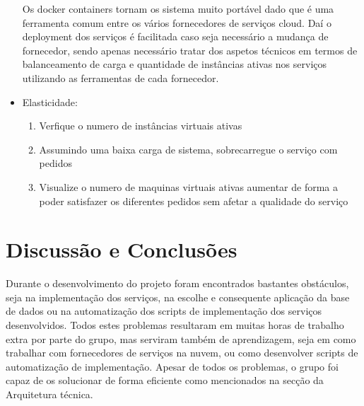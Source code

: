 \documentclass[11pt,a4paper]{article}
\begin{document}
\begin{itemize}
Os docker containers tornam os sistema muito portável dado que é uma ferramenta comum entre os vários fornecedores de serviços cloud. Daí o deployment dos serviços é facilitada caso seja necessário a mudança de fornecedor, sendo apenas necessário tratar dos aspetos técnicos em termos de balanceamento de carga e quantidade de instâncias ativas nos serviços utilizando as ferramentas de cada fornecedor.

	\item Elasticidade:
	\begin{enumerate}
		\item Verfique o numero de instâncias virtuais ativas
		\item Assumindo uma baixa carga de sistema, sobrecarregue o serviço com pedidos
		\item Visualize o numero de maquinas virtuais ativas aumentar de forma a poder satisfazer os diferentes pedidos sem afetar a qualidade do serviço
	\end{enumerate}
\end{itemize}

\section{Discussão e Conclusões}
Durante o desenvolvimento do projeto foram encontrados bastantes obstáculos, seja na implementação dos serviços, na escolhe e consequente aplicação da base de dados ou na automatização dos scripts de implementação dos serviços desenvolvidos. Todos estes problemas resultaram em muitas horas de trabalho extra por parte do grupo, mas serviram também de aprendizagem, seja em como trabalhar com fornecedores de serviços na nuvem, ou como desenvolver scripts de automatização de implementação. Apesar de todos os problemas, o grupo foi capaz de os solucionar de forma eficiente como mencionados na secção da Arquitetura técnica.
\end{document}
